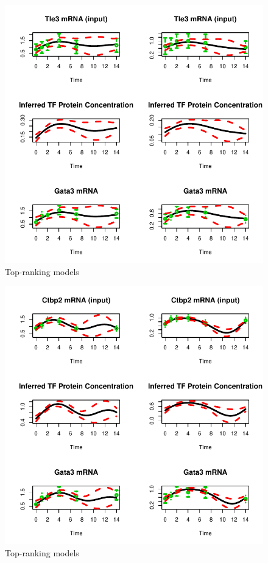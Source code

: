 \documentclass{article}
\begin{document}
\begin{figure}[htb]
  \centering
  \includegraphics[width=\columnwidth]{gpdisim_Tle3_Gata3}
  \caption{Top-ranking models}
  \label{fig:model2}
\end{figure}

\begin{figure}[htb]
  \centering
  \includegraphics[width=\columnwidth]{gpdisim_Ctbp2_Gata3}
  \caption{Top-ranking models}
  \label{fig:model3}
\end{figure}
\end{document}
